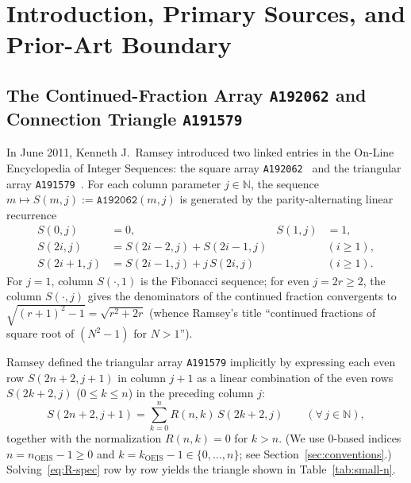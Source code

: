 \documentclass[11pt]{article}
\theoremstyle{definition}
\newcommand{\N}{\mathbb{N}}
\newcommand{\seq}[1]{\texttt{#1}}
\begin{document}
\section{Introduction, Primary Sources, and Prior-Art Boundary}

\subsection{The Continued-Fraction Array \seq{A192062} and Connection Triangle \seq{A191579}}

In June 2011, Kenneth J.\ Ramsey introduced two linked entries in the On-Line Encyclopedia of Integer Sequences: the square array \seq{A192062}~\cite{oeis192062} and the triangular array \seq{A191579}~\cite{oeis191579}. For each column parameter $j \in \N$, the sequence $m \mapsto S(m, j) := \seq{A192062}(m, j)$ is generated by the parity-alternating linear recurrence
\begin{equation}
\label{eq:S-rec}
\begin{aligned}
S(0, j) &= 0, & S(1, j) &= 1, \\
S(2i, j) &= S(2i - 2, j) + S(2i - 1, j) && (i \ge 1), \\
S(2i + 1, j) &= S(2i - 1, j) + j\,S(2i, j) && (i \ge 1).
\end{aligned}
\end{equation}
For $j = 1$, column $S(\cdot, 1)$ is the Fibonacci sequence; for even $j = 2r \ge 2$, the column $S(\cdot, j)$ gives the denominators of the continued fraction convergents to $\sqrt{(r+1)^2 - 1} = \sqrt{r^2 + 2r}$ (whence Ramsey's title ``continued fractions of square root of $(N^2 - 1)$ for $N > 1$'').

Ramsey defined the triangular array \seq{A191579} implicitly by expressing each even row $S(2n+2, j+1)$ in column $j+1$ as a linear combination of the even rows $S(2k+2, j)$ ($0 \le k \le n$) in the preceding column $j$:
\begin{equation}
\label{eq:R-spec}
S(2n + 2, j + 1) = \sum_{k=0}^{n} R(n, k)\,S(2k + 2, j) \qquad (\forall\, j \in \N),
\end{equation}
together with the normalization $R(n, k) = 0$ for $k > n$. (We use $0$-based indices $n = n_{\mathrm{OEIS}} - 1 \ge 0$ and $k = k_{\mathrm{OEIS}} - 1 \in \{0, \dots, n\}$; see Section~\ref{sec:conventions}.) Solving~\eqref{eq:R-spec} row by row yields the triangle shown in Table~\ref{tab:small-n}.
\end{document}
